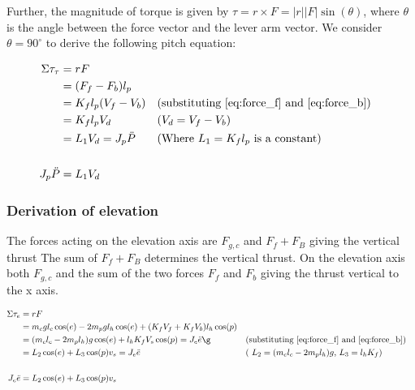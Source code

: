 Further, the magnitude of torque is given by $ \tau=r\times F = |r||F| \sin(\theta) $,
where $ \theta $ is the angle between the force vector and the lever arm vector. We consider $\theta=90^{\circ}$ to derive the following pitch equation:

\begin{align} 
\Sigma{\tau}_{\tau} &=  rF \nonumber \\ 
 &=  (F_f-F_b)l_p \nonumber\\
 &=K_f l_p (V_f-V_b)&&\text{(substituting \ref{eq:force_f} and \ref{eq:force_b})} &  \nonumber\\
 &= K_f l_p V_d &&\text{($ V_d = V_f - V_b$)} \nonumber \\
 &=L_1V_d = J_p \ddot{P} &&\text{(Where $L_1=K_f l_p$ is a constant)} \nonumber\\\nonumber
 \\ 
 J_p \ddot{P}&=L_1V_d \label{eq:pitch}
\end{align}



\subsubsection{Derivation of elevation}
The forces acting on the elevation axis are $F_{g,c}$ and $F_f + F_B$ giving the vertical thrust 
The sum of $F_f + F_B$ determines the vertical thrust. 
On the elevation axis both $F_{g,c}$ and the sum of the two forces $F_f$ and $F_b$ giving the thrust vertical to the x axis. 

\begin{align} 
\Sigma{\tau}_{e} &=  rF \nonumber\\ 
 &= {{m_c}g{l_c}\cos (e) - 2{m_p}g{l_h}\cos (e) + ({K_f}{V_f} + {K_f}{V_b}){l_h}\cos (p)} \nonumber\\ 
 &= ({m_c}{l_c} - 2{m_p}{l_h})g\cos (e) + {l_h}{K_f}{V_s}\cos (p) = {J_e}\ddot e\g 
 &&\text{(substituting \ref{eq:force_f} and \ref{eq:force_b})} \nonumber\\ 
 &= L_2\cos(e)+ L_3 \cos(p)v_s = J_e\ddot{e}  &&\text{( $ 
{L_2} = ({m_c}{l_c} - 2{m_p}{l_h})g$, $L_3=l_h K_f$)} \nonumber \\
\nonumber\\
 J_e\ddot{e}&= L_2\cos(e)+ L_3 \cos(p)v_s \label{eq:elevation}
\end{align}



